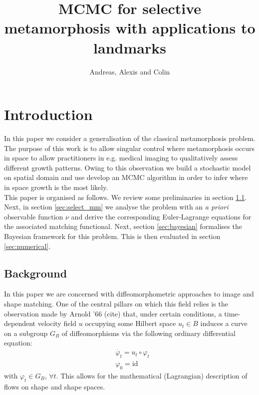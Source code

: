 \documentclass{article}
\begin{document}
\title{MCMC for selective metamorphosis with applications to landmarks}
\author{Andreas, Alexis and Colin}
\maketitle
\section{Introduction}

In this paper we consider a generalisation of the classical metamorphosis
problem. The purpose of this work is to allow singular control where
metamorphosis occurs in space to allow practitioners in e.g. medical imaging to
qualitatively assess different growth patterns. Owing to this observation we
build a stochastic model on spatial domain and use develop an MCMC algorithm in
order to infer where in space growth is the most likely.\\

This paper is organised as follows. We review some preliminaries in section
\ref{sec:bg}. Next, in section \ref{sec:select_mm} we analyse the problem with
an \emph{a priori} observable function $\nu$ and derive the corresponding
Euler-Lagrange equations for the associated matching functional. Next, section
\ref{sec:bayesian} formalises the Bayesian framework for this problem. This is
then evaluated in section \ref{sec:numerical}.

\subsection{Background}\label{sec:bg}

In this paper we are concerned with diffeomorphometric approaches to image and
shape matching. One of the central pillars on which this field relies is the
observation made by Arnold '66 (cite) that, under certain conditions, a
time-dependent velocity field $u$ occupying some Hilbert space $u_t \in B$
induces a curve on a subgroup $G_B$ of diffeomorphisms \cite{younes2010shapes}
via the following ordinary differential
equation:
\begin{subequations}
\begin{align}
& \dot{\varphi_t} = u_t \circ \varphi_t\\
& \varphi_0 = \text{id}
\end{align}
\end{subequations}
with $\varphi_t \in G_B$, $\forall t$. This allows for the mathematical
(Lagrangian) description of flows on shape and shape spaces.\\
\end{document}
